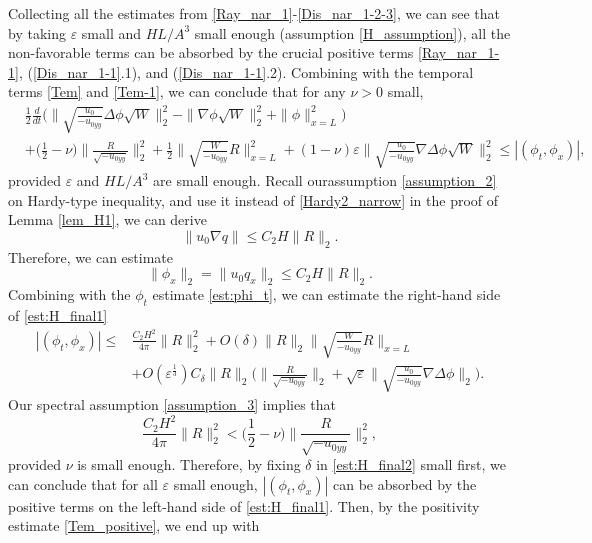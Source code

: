 \documentclass[reqno, 11pt]{amsart}
\theoremstyle{plain}
\theoremstyle{definition}
\theoremstyle{remark}
\numberwithin{equation}{section}
\begin{document}
 Collecting all the estimates from \eqref{Ray_nar_1}-\eqref{Dis_nar_1-2-3}, we can see that by taking $\varepsilon$ small and $HL/A^3$ small enough (assumption \eqref{H_assumption}), all the non-favorable terms can be absorbed by the crucial positive terms \eqref{Ray_nar_1-1}, (\ref{Dis_nar_1-1}.1), and (\ref{Dis_nar_1-1}.2). Combining with the temporal terms \eqref{Tem} and \eqref{Tem-1}, we can conclude that for any $\nu>0$ small, 
\begin{equation}\label{est:H_final1}
\begin{aligned}
&\frac{1}{2}\frac{d}{dt}\Big( \|\sqrt{\frac{u_0}{-u_{0yy}}} \Delta \phi \sqrt{W}\|_2^2 - \| \nabla \phi \sqrt{W}\|_2^2 + \| \phi\|_{x=L}^2 \Big)\\
&+ \Big(\frac{1}{2}- \nu \Big)  \|\frac{R}{\sqrt{-u_{0yy}}}\|_2^2 + \frac{1}{2}\|\sqrt{\frac{W}{-u_{0yy}}}R\|_{x=L}^2 + (1-\nu) \varepsilon  \| \sqrt{\frac{u_0}{-u_{0yy}}} \nabla \Delta \phi \sqrt{W}\|_2^2 \le |(\phi_t, \phi_x)|,
\end{aligned}
\end{equation}
provided $\varepsilon$ and $HL/A^3$ are small enough. Recall ourassumption \eqref{assumption_2} on Hardy-type inequality, and use it instead of \eqref{Hardy2_narrow} in the proof of Lemma \ref{lem_H1}, we can derive
$$
\|u_0 \nabla q\| \le C_2 H \|R\|_2.
$$
Therefore, we can estimate
\begin{equation}\label{est:phi_x_final}
\|\phi_x\|_2 = \|u_0 q_x\|_2 \le C_2 H \|R\|_2.
\end{equation}
Combining with the $\phi_t$ estimate \eqref{est:phi_t}, we can estimate the right-hand side of \eqref{est:H_final1}
\begin{equation}\label{est:H_final2}
\begin{aligned}
|(\phi_t, \phi_x)| \le& \frac{C_2H^2}{4\pi} \|R\|_2^2 + O(\delta)\|R\|_2 \| \sqrt{\frac{W}{-u_{0yy}}} R\|_{x= L}\\
& + O(\varepsilon^{\frac{1}{3}})C_\delta \|R\|_2 \Big( \|\frac{R}{\sqrt{-u_{0yy}}}\|_2 + \sqrt{\varepsilon} \| \sqrt{\frac{u_0}{-u_{0yy}}} \nabla \Delta \phi\|_2\Big).
\end{aligned}
\end{equation}
Our spectral assumption \eqref{assumption_3} implies that
$$
\frac{C_2H^2}{4\pi} \|R\|_2^2 <  \Big(\frac{1}{2}- \nu \Big)  \|\frac{R}{\sqrt{-u_{0yy}}}\|_2^2,
$$
provided $\nu$ is small enough. Therefore, by fixing $\delta$ in \eqref{est:H_final2} small first, we can conclude that for all $\varepsilon$ small enough, $|(\phi_t, \phi_x)|$ can be absorbed by the positive terms on the left-hand side of \eqref{est:H_final1}. Then, by the positivity estimate \eqref{Tem_positive}, we end up with
\end{document}
